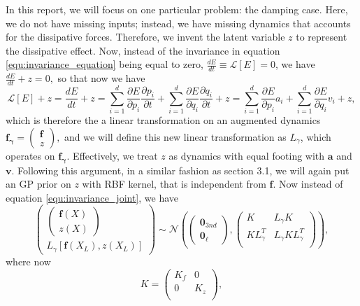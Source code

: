 \documentclass{statsmsc}
\begin{document}
In this report, we will focus on one particular problem: the damping case.
Here, we do not have missing inputs; instead, we have missing dynamics that accounts for the dissipative forces. 
Therefore, we invent the latent variable $z$ to represent the dissipative effect.
Now, instead of the invariance in equation \ref{equ:invariance_equation} being equal to zero, $\frac{dE}{dt}\equiv\mathcal{L}[E]=0$, we have $\frac{dE}{dt}+z=0,$ so that now we have 
\begin{equation}
\mathcal{L}[E] + z = \frac{dE}{dt} + z =\sum_{i=1}^d \frac{\partial E}{\partial p_i} \frac{\partial p_i}{\partial t}+ \sum_{i=1}^d\frac{\partial E}{\partial q_i}\frac{\partial q_i}{\partial t} + z = \sum_{i=1}^d \frac{\partial E}{\partial p_i} a_i + \sum_{i=1}^d\frac{\partial E}{\partial q_i} v_i + z,
\label{equ:LEplusZ}
\end{equation}
which is therefore the a linear transformation on an augmented dynamics $\mathbf{f_\gamma}=\begin{pmatrix}
  \mathbf{f}\\z
\end{pmatrix},$
and we will define this new linear transformation as $L_\gamma$, which operates on $\mathbf{f_\gamma}.$
Effectively, we treat $z$ as dynamics with equal footing with $\mathbf{a}$ and $\mathbf{v}$.
Following this argument, in a similar fashion as section 3.1, we will again put an GP prior on $z$ with RBF kernel, that is independent from $\mathbf{f}$.
Now instead of equation \ref{equ:invariance_joint}, we have 
\begin{equation}
\begin{pmatrix}
\begin{pmatrix}\mathbf{f}(X)\\ z(X)\end{pmatrix}\\L_\gamma[\mathbf{f}(X_L), z(X_L)]
\end{pmatrix}
\sim\mathcal{N}
\left(\begin{pmatrix}\mathbf{0}_{3nd}\\\mathbf{0}_{\ell}\end{pmatrix}, \begin{pmatrix}
    K & L_\gamma K \\
    KL_\gamma^T & L_\gamma KL_\gamma^T\\
\end{pmatrix}\right),
\label{equ:joint_withZ}
\end{equation}
where now 
$$
K = \begin{pmatrix}
  K_f & 0 \\
  0 & K_z\\
\end{pmatrix},
$$
\end{document}
